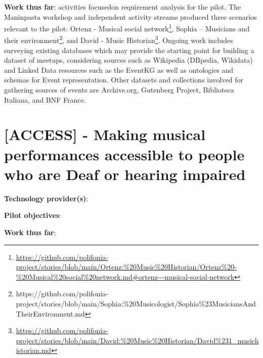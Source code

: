 \textbf{Work thus far}: activities focusedon requirement analysis for the pilot. The Maninpasta workshop and independent activity streams produced three scenarios relevant to the pilot: Ortenz - Musical social network\footnote{\url{https://github.com/polifonia-project/stories/blob/main/Ortenz:\%20Music\%20Historian/Ortenz\%20-\%20Musical\%20social\%20network.md\#ortenz---musical-social-network}}, Sophia -- Musicians and their environment\footnote{https://github.com/polifonia-project/stories/blob/main/Sophia:\%20Musicologist/Sophia\%23MusiciansAndTheirEnvironment.md}, and David - Music Historian\footnote{\url{https://github.com/polifonia-project/stories/blob/main/David:\%20Music\%20Historian/David\%231_musichistorian.md}}.
Ongoing work includes surveying existing databases which may provide the starting point for building a dataset of meetups, considering sources such as Wikipedia (DBpedia, Wikidata) and Linked Data resources such as the EventKG as well as ontologies and schemas for Event representation.
Other datasets and collections involved for gathering sources of events are Archive.org, Gutenberg Project, Biblioteca Italiana, and BNF France. 



\section{[ACCESS] - Making musical performances accessible to people who are Deaf or hearing impaired}\label{sec:pilot:access}

\textbf{Technology provider(s)}: 

\textbf{Pilot objectives}:

\textbf{Work thus far}: